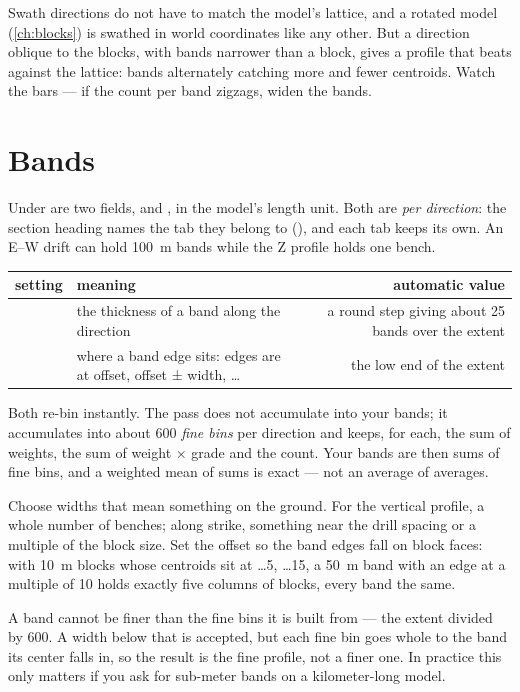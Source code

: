 \begin{note}
Swath directions do not have to match the model's lattice, and a rotated model (\cref{ch:blocks}) is swathed in world coordinates like any other. But a direction oblique to the blocks, with bands narrower than a block, gives a profile that beats against the lattice: bands alternately catching more and fewer centroids. Watch the bars — if the count per band zigzags, widen the bands.
\end{note}

\section{Bands}\label{sec:swath-bands}
Under  are two fields,  and , in the model's length unit. Both are \emph{per direction}: the section heading names the tab they belong to (), and each tab keeps its own. An E–W drift can hold 100~m bands while the Z profile holds one bench.

\medskip
\begin{tabularx}{\linewidth}{@{}lMD@{}}\toprule
setting & meaning & automatic value \\ \midrule
{} & the thickness of a band along the direction & a round step giving about 25 bands over the extent \\
 & where a band edge sits: edges are at offset, offset ± width, … & the low end of the extent \\ \bottomrule
\end{tabularx}
\medskip

Both re-bin instantly. The pass does not accumulate into your bands; it accumulates into about 600 \emph{fine bins} per direction and keeps, for each, the sum of weights, the sum of weight × grade and the count. Your bands are then sums of fine bins, and a weighted mean of sums is exact — not an average of averages.

Choose widths that mean something on the ground. For the vertical profile, a whole number of benches; along strike, something near the drill spacing or a multiple of the block size. Set the offset so the band edges fall on block faces: with 10~m blocks whose centroids sit at …5, …15, a 50~m band with an edge at a multiple of 10 holds exactly five columns of blocks, every band the same.

\begin{caution}
A band cannot be finer than the fine bins it is built from — the extent divided by 600. A width below that is accepted, but each fine bin goes whole to the band its center falls in, so the result is the fine profile, not a finer one. In practice this only matters if you ask for sub-meter bands on a kilometer-long model.
\end{caution}

